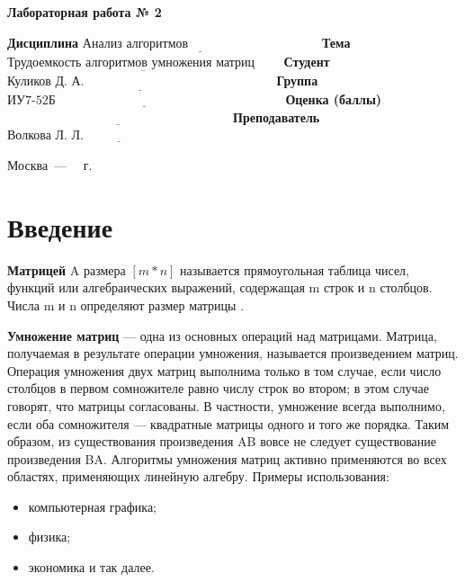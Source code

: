 \documentclass[12pt]{report}
\begin{document}
\begin{center}
\Large\textbf{Лабораторная работа № 2}
\end{center}
\vspace{\baselineskip}
\noindent\textbf{Дисциплина} $\underline{\text{Анализ алгоритмов~~~~~~~~~~~~~~~~~~~~~~~~~~~~~~~}}$\newline\newline
\noindent\textbf{Тема} $\underline{\text{Трудоемкость алгоритмов умножения матриц~~~~~~}}$\newline\newline
\noindent\textbf{Студент} $\underline{\text{Куликов Д. А.~~~~~~~~~~~~~~~~~~~~~~~~~~~~~~~~~~~~~~~~~~~~~}}$\newline\newline
\noindent\textbf{Группа} $\underline{\text{ИУ7-52Б~~~~~~~~~~~~~~~~~~~~~~~~~~~~~~~~~~~~~~~~~~~~~~~~~~~~~~}}$\newline\newline
\noindent\textbf{Оценка (баллы)} $\underline{\text{~~~~~~~~~~~~~~~~~~~~~~~~~~~~~~~~~~~~~~~~~~~~~~~~~~~~~}}$\newline\newline
\noindent\textbf{Преподаватель} $\underline{\text{Волкова Л. Л.~~~~~~~~~~~~~~~~~~~~~~~~~~~~~~~~~~~}}$\newline

\begin{center}
	\vfill
	Москва~---~\the\year
	~г.
\end{center}
\clearpage

\tableofcontents

\newpage
\chapter*{Введение}
\textbf{Матрицей} A размера $[m*n]$ называется прямоугольная таблица
чисел, функций или алгебраических выражений, содержащая m строк и n столбцов. Числа m и n определяют размер матрицы \cite{mtrbook}. 

\textbf{Умножение матриц} — одна из основных операций над матрицами.
Матрица, получаемая в результате операции умножения, называется
произведением матриц. Операция умножения двух матриц выполнима только в
том случае, если число столбцов в первом сомножителе равно числу строк во
втором; в этом случае говорят, что матрицы согласованы. В частности,
умножение всегда выполнимо, если оба сомножителя — квадратные матрицы
одного и того же порядка. Таким образом, из существования произведения AB
вовсе не следует существование произведения BA.
Алгоритмы умножения матриц активно применяются во всех областях, применяющих
линейную алгебру. Примеры использования:
\begin{itemize}
	\item компьютерная графика;
	\item физика;
	\item экономика и так далее.
\end{itemize}
\vspace{\baselineskip}
\end{document}
